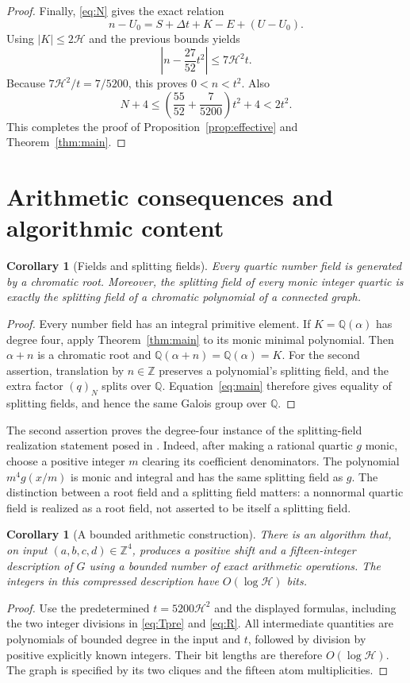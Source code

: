 \documentclass[11pt,a4paper]{article}
\newtheorem{corollary}[theorem]{Corollary}
\theoremstyle{definition}
\newcommand{\Z}{\mathbb Z}
\newcommand{\Q}{\mathbb Q}
\newcommand{\fall}[2]{(#1)_{#2}}
\newcommand{\htf}{\mathcal H}
\begin{document}
\begin{proof}
Finally, \eqref{eq:N} gives the exact relation
\[
 n-U_0=S+\Delta t+K-E+(U-U_0).
\]
Using $|K|\le2\htf$ and the previous bounds yields
\begin{equation}\label{eq:nbound}
 \left|n-\frac{27}{52}t^2\right|\le7\htf^2t.
\end{equation}
Because $7\htf^2/t=7/5200$, this proves $0<n<t^2$.
Also
\[
 N+4\le\left(\frac{55}{52}+\frac7{5200}\right)t^2+4<2t^2.
\]
This completes the proof of Proposition~\ref{prop:effective} and
Theorem~\ref{thm:main}.
\end{proof}

\section{Arithmetic consequences and algorithmic content}

\begin{corollary}[Fields and splitting fields]\label{cor:fields}
Every quartic number field is generated by a chromatic root. Moreover,
the splitting field of every monic integer quartic is exactly the
splitting field of a chromatic polynomial of a connected graph.
\end{corollary}
\begin{proof}
Every number field has an integral primitive element. If
$K=\Q(\alpha)$ has degree four, apply Theorem~\ref{thm:main} to its
monic minimal polynomial. Then $\alpha+n$ is a chromatic root and
$\Q(\alpha+n)=\Q(\alpha)=K$.
For the second assertion, translation by $n\in\Z$ preserves a
polynomial's splitting field, and the extra factor $\fall qN$ splits
over $\Q$. Equation~\eqref{eq:main} therefore gives equality of
splitting fields, and hence the same Galois group over $\Q$.
\end{proof}

The second assertion proves the degree-four instance of the splitting-field
realization statement posed in \cite[Conjecture 7.1]{Gilmore}.
Indeed, after making a rational quartic $g$ monic, choose a positive
integer $m$ clearing its coefficient denominators. The polynomial
$m^4g(x/m)$ is monic and integral and has the same splitting field as $g$.
The distinction between a root field and a splitting field matters:
a nonnormal quartic field is realized as a root field, not asserted to
be itself a splitting field.

\begin{corollary}[A bounded arithmetic construction]\label{cor:algorithm}
There is an algorithm that, on input $(a,b,c,d)\in\Z^4$, produces a
positive shift and a fifteen-integer description of $G$ using a bounded
number of exact arithmetic operations. The integers in this compressed
description have $O(\log\htf)$ bits.
\end{corollary}
\begin{proof}
Use the predetermined $t=5200\htf^2$ and the displayed formulas, including
the two integer divisions in \eqref{eq:Tpre} and \eqref{eq:R}.
All intermediate quantities are polynomials of bounded degree in the
input and $t$, followed by division by positive explicitly known integers.
Their bit lengths are therefore $O(\log\htf)$. The graph is specified
by its two cliques and the fifteen atom multiplicities.
\end{proof}
\end{document}
